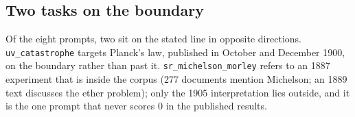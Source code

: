 
\subsection{Two tasks on the boundary}

Of the eight prompts, two sit on the stated line in opposite directions. \texttt{uv\_catastrophe} targets Planck's law, published in October and December 1900, on the boundary rather than past it. \texttt{sr\_michelson\_morley} refers to an 1887 experiment that is inside the corpus (277 documents mention Michelson; an 1889 text discusses the ether problem); only the 1905 interpretation lies outside, and it is the one prompt that never scores 0 in the published results.
